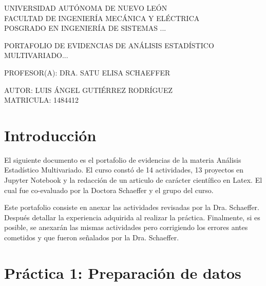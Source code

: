 \documentclass[12pt, letter]{report}
\begin{document}
	
\begin{titlepage}	
	\begin{center}
		\huge UNIVERSIDAD AUTÓNOMA DE NUEVO LEÓN\\
		\bigskip
		\bigskip
		FACULTAD DE INGENIERÍA MECÁNICA Y ELÉCTRICA\\
		\bigskip
		\bigskip
		POSGRADO EN INGENIERÍA DE SISTEMAS ... \\
		\bigskip
		\bigskip
		\bigskip
		\bigskip
		\begin{Large}
			PORTAFOLIO DE EVIDENCIAS DE ANÁLISIS ESTADÍSTICO MULTIVARIADO... \\
		\end{Large}
		\bigskip
		\bigskip
		\begin{large}
		\bigskip
			PROFESOR(A): DRA. SATU ELISA SCHAEFFER\\
		\bigskip
		\end{large}
		\bigskip
		\bigskip
		\bigskip
		\begin{large}
			AUTOR: LUIS ÁNGEL GUTIÉRREZ RODRÍGUEZ\\
			MATRICULA: 1484412\\
		\end{large}
	\end{center}	
\end{titlepage}	





\chapter*{Introducción}

El siguiente documento es el portafolio de evidencias de la materia Análisis Estadístico Multivariado. El curso constó de 14 actividades, 13 proyectos en Jupyter Notebook y la redacción de un articulo de carácter científico en Latex. El cual fue co-evaluado por la Doctora Schaeffer y el grupo del curso.

Este portafolio consiste en anexar las actividades revisadas por la Dra. Schaeffer. Después detallar la experiencia adquirida al realizar la práctica. Finalmente, si es posible, se anexarán las mismas actividades pero corrigiendo los errores antes cometidos y que fueron señalados por la Dra. Schaeffer.


\newpage

\chapter*{Práctica 1: Preparación de datos}
\end{document}
